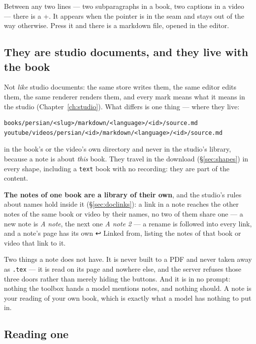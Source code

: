\documentclass[11pt,oneside]{report}
\newcommand{\sym}[1]{{\symfont #1}}
\newcommand{\file}[1]{\texttt{#1}}
\newcommand{\menu}[1]{\textsf{#1}}
\begin{document}
Between any two lines --- two subparagraphs in a book, two captions in a
video --- there is a \menu{+}. It appears when the pointer is in the seam and
stays out of the way otherwise. Press it and there is a markdown file, opened
in the editor.

\subsection*{They are studio documents, and they live with the book}

Not \emph{like} studio documents: the same store writes them, the same editor
edits them, the same renderer renders them, and every mark means what it
means in the studio (Chapter~\ref{ch:studio}). What differs is one thing ---
where they live:

\begin{lstlisting}
books/persian/<slug>/markdown/<language>/<id>/source.md
youtube/videos/persian/<id>/markdown/<language>/<id>/source.md
\end{lstlisting}

\noindent in the book's or the video's own directory and never in the
studio's library, because a note is about \emph{this} book. They travel in
the download (\S\ref{sec:shapes}) in every shape, including a \texttt{text}
book with no recording: they are part of the content.

\textbf{The notes of one book are a library of their own}, and the studio's
rules about names hold inside it (\S\ref{sec:doclinks}): a link in a note
reaches the other notes of the same book or video by their names, no two of
them share one --- a new note is \emph{A note}, the next one
\emph{A note 2} --- a rename is followed into every link, and a note's page
has its own \menu{\sym{↩} Linked from}, listing the notes of that book or
video that link to it.

Two things a note does not have. It is never built to a PDF and never taken
away as \file{.tex} --- it is read on its page and nowhere else, and the
server refuses those three doors rather than merely hiding the buttons. And
it is in no prompt: nothing the toolbox hands a model mentions notes, and
nothing should. A note is your reading of your own book, which is exactly
what a model has nothing to put in.

\subsection*{Reading one}
\end{document}
